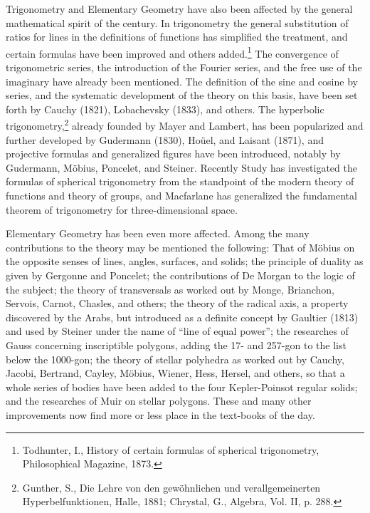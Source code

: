 \documentclass[oneside]{book}
\begin{document}
{Trigonometry and Elementary Geometry have also been affected by the
general mathematical spirit of the century. In trigonometry the
general substitution of ratios for lines in the definitions of
functions has simplified the treatment, and certain formulas have
been improved and others added.\footnote{Todhunter, I., History of
certain formulas of spherical trigonometry, Philosophical Magazine,
1873.} The convergence of trigonometric series, the introduction of
the Fourier series, and the free use of the imaginary have already
been mentioned. The definition of the sine and cosine by series, and
the systematic development of the theory on this basis, have been
set forth by Cauchy (1821), Lobachevsky (1833), and others. The
hyperbolic trigonometry,\footnote{Gunther, S., Die Lehre von den
gew\"ohnlichen und verallgemeinerten Hyperbelfunktionen, Halle, 1881;
Chrystal, G., Algebra, Vol. II, p. 288.} already founded by Mayer and
Lambert, has been popularized and further developed by Gudermann
(1830), Ho\"uel, and Laisant (1871), and projective formulas and
generalized figures have been introduced, notably by Gudermann,
M\"obius, Poncelet, and Steiner. Recently Study has investigated the
formulas of spherical trigonometry from the standpoint of the modern
theory of functions and theory of groups, and Macfarlane has
generalized the fundamental theorem of trigonometry for
three-dimensional space.

Elementary Geometry has been even more affected. Among the many
contributions to the theory may be mentioned the following: That of
M\"obius on the opposite senses of lines, angles, surfaces, and
solids; the principle of duality as given by Gergonne and Poncelet;
the contributions of De Morgan to the logic of the subject; the
theory of transversals as worked out by Monge, Brianchon, Servois,
Carnot, Chasles, and others; the theory of the radical axis, a
property discovered by the Arabs, but introduced as a definite
concept by Gaultier (1813) and used by Steiner under the name of
``line of equal power''; the researches of Gauss concerning
inscriptible polygons, adding the 17- and 257-gon to the list below
the 1000-gon; the theory of stellar polyhedra as worked out by
Cauchy, Jacobi, Bertrand, Cayley, M\"obius, Wiener, Hess, Hersel,
and others, so that a whole series of bodies have been added to the
four Kepler-Poinsot regular solids; and the researches of Muir on
stellar polygons. These and many other improvements now find more or
less place in the text-books of the day.

}
\end{document}
